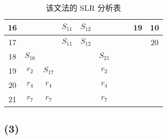 \documentclass[UTF8]{ctexart}
\begin{document}
\begin{table}[htbp!]
\begin{tabular}{|c|c|c|c|c|c|c|c|c|c|}
                \hline
                16 & & & $S_{11}$ & $S_{12}$ & & & & 19 & 10 \\
                \hline
                17 & & & $S_{11}$ & $S_{12}$ & & & & & 20 \\
                \hline
                18 & $S_{16}$ & & & & $S_{21}$ & & & & \\
                \hline
                19 & $r_2$ & $S_17$ & & & $r_2$ & & & & \\
                \hline
                20 & $r_4$ & $r_4$ & & & $r_4$ & & & & \\
                \hline
                21 & $r_7$ & $r_7$ & & & $r_7$ & & & & \\
                \hline
            \end{tabular}
            \caption{该文法的 SLR 分析表}
            \label{lr1table}
        \end{table}
    \subsection*{(3)}
\end{document}
